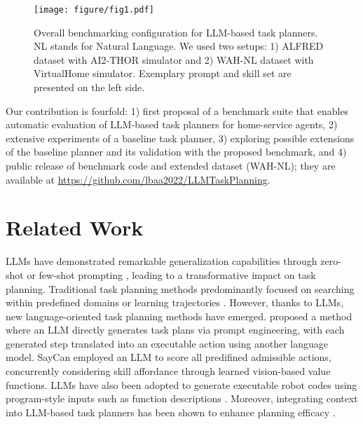 \begin{figure}
    \centering
    \texttt{[image: figure/fig1.pdf]}
    \caption{Overall benchmarking configuration for LLM-based task planners. NL stands for Natural Language. We used two setups: 1) ALFRED dataset with AI2-THOR simulator and 2) WAH-NL dataset with VirtualHome simulator. Exemplary prompt and skill set are presented on the left side.}
    \label{fig:fig1}
\end{figure}

Our contribution is fourfold: 1) first proposal of a benchmark suite that enables automatic evaluation of LLM-based task planners for home-service agents, 2) extensive experiments of a baseline task planner, 3) exploring possible extensions of the baseline planner and its validation with the proposed benchmark, and 4) public release of benchmark code and extended dataset (WAH-NL); they are available at \url{https://github.com/lbaa2022/LLMTaskPlanning}.

\section{Related Work}
\label{sec:related_work}

LLMs have demonstrated remarkable generalization capabilities through zero-shot or few-shot prompting \citep{brown2020language}, leading to a transformative impact on task planning. Traditional task planning methods predominantly focused on searching within predefined domains \citep{fikes1971strips, garrett2020pddlstream, hoffmann2001ff} or learning trajectories \citep{silver2023learning, shah2022value, li2022pre, itcher2022broadly, nair2020hierarchical, eysenbach2019search, xu2019regression}. However, thanks to LLMs, new language-oriented task planning methods have emerged. \citet{huang2022language} proposed a method where an LLM directly generates task plans via prompt engineering, with each generated step translated into an executable action using another language model. SayCan \citep{ahn2023do} employed an LLM to score all predifined admissible actions, concurrently considering skill affordance through learned vision-based value functions. LLMs have also been adopted to generate executable robot codes using program-style inputs such as function descriptions \citep{liang2023code, singh2023progprompt, zelikman2022parsel}. Moreover, integrating context into LLM-based task planners has been shown to enhance planning efficacy \citep{huang2023inner, yao2023react, chen2023open, lin2023grounded, wu2023plan}.

